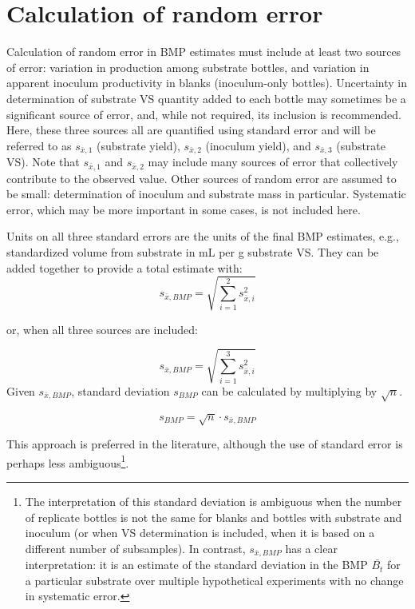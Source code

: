 \documentclass[]{article}
\begin{document}
\section{Calculation of random error}
Calculation of random error in BMP estimates must include at least two sources of error: variation in  production among substrate bottles, and variation in apparent inoculum  productivity in blanks (inoculum-only bottles).
Uncertainty in determination of substrate VS quantity added to each bottle may sometimes be a significant source of error, and, while not required, its inclusion is recommended. 
Here, these three sources all are quantified using standard error and will be referred to as $s_{\bar{x},1}$ (substrate yield), $s_{\bar{x},2}$ (inoculum yield), and $s_{\bar{x},3}$ (substrate VS). 
Note that $s_{\bar{x},1}$ and $s_{\bar{x},2}$ may include many sources of error that collectively contribute to the observed value. 
Other sources of random error are assumed to be small: determination of inoculum and substrate mass in particular. 
Systematic error, which may be more important in some cases, is not included here. 

Units on all three standard errors are the units of the final BMP estimates, e.g., standardized  volume from substrate in mL per g substrate VS. 
They can be added together to provide a total estimate with:
\begin{equation}
  \label{eq:se_sum}
  s_{\bar{x},BMP} = \sqrt{\sum_{i=1} ^2 s_{\bar{x},i}^2}
\end{equation}

or, when all three sources are included:

\begin{equation}
  \label{eq:se_sum_3}
  s_{\bar{x},BMP} = \sqrt{\sum_{i=1} ^3 s_{\bar{x},i}^2}
\end{equation}
Given $s_{\bar{x},BMP}$, standard deviation $s_{BMP}$ can be calculated by multiplying by $\sqrt{n}$.

\begin{equation}
  \label{eq:sd}
  s_{BMP} = \sqrt{n} \cdot s_{\bar{x},BMP}
\end{equation}

This approach is preferred in the literature, although the use of standard error is perhaps less ambiguous\footnote{The interpretation of this standard deviation is ambiguous when the number of replicate bottles is not the same for blanks and bottles with substrate and inoculum (or when VS determination is included, when it is based on a different number of subsamples). 
In contrast, $s_{\bar{x},BMP}$ has a clear interpretation: it is an estimate of the standard deviation in the BMP $\bar{B_t}$ for a particular substrate over multiple hypothetical experiments with no change in systematic error.}. 
\end{document}
